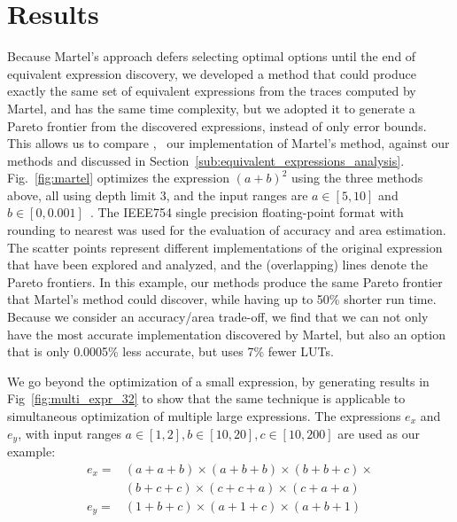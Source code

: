 \section{Results}
\label{sec:results}

Because Martel's approach defers selecting optimal options until the end of
equivalent expression discovery, we developed a method that could produce
exactly the same set of equivalent expressions from the traces computed by
Martel, and has the same time complexity, but we adopted it to generate a
Pareto frontier from the discovered expressions, instead of only error bounds.
This allows us to compare \marteltrace{}, \ie~our implementation of Martel's
method, against our methods \frontiertrace{} and \greedytrace{} discussed
in Section~\ref{sub:equivalent_expressions_analysis}. Fig.~\ref{fig:martel}
optimizes the expression ${(a + b)}^2$ using the three methods above, all
using depth limit $3$, and the input ranges are $a \in [5, 10]$ and $b \in [0,
0.001]$~\cite{martel07}. The IEEE754 single precision floating-point format
with rounding to nearest was used for the evaluation of accuracy and area
estimation. The scatter points represent different implementations of the
original expression that have been explored and analyzed, and the (overlapping)
lines denote the Pareto frontiers. In this example, our methods produce the
same Pareto frontier that Martel's method could discover, while having up to
50\% shorter run time. Because we consider an accuracy/area trade-off, we
find that we can not only have the most accurate implementation discovered by
Martel, but also an option that is only 0.0005\% less accurate, but uses 7\%
fewer LUTs.

We go beyond the optimization of a small expression, by generating results in
Fig~\ref{fig:multi_expr_32} to show that the same technique is applicable to
simultaneous optimization of multiple large expressions. The expressions $e_x$
and $e_y$, with input ranges $a \in [1, 2], b \in [10, 20], c \in [10, 200]$
are used as our example:
\begin{equation}
    \begin{aligned}
    e_x =& (a + a + b) \times (a + b + b) \times (b + b + c) \times {} \\
         & (b + c + c) \times (c + c + a) \times (c + a + a) \\
    e_y =& (1 + b + c) \times (a + 1 + c) \times (a + b + 1)
    \end{aligned}
\end{equation}

